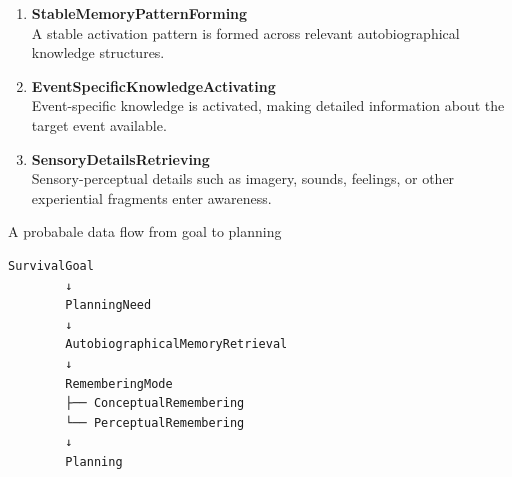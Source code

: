 \documentclass[a4paper]{article}
\begin{document}
\begin{enumerate}
        \item \textbf{StableMemoryPatternForming}\\
        A stable activation pattern is formed across relevant autobiographical knowledge structures.
        
        \item \textbf{EventSpecificKnowledgeActivating}\\
        Event-specific knowledge is activated, making detailed information about the target event available.
        
        \item \textbf{SensoryDetailsRetrieving}\\
        Sensory-perceptual details such as imagery, sounds, feelings, or other experiential fragments enter awareness.
    \end{enumerate}
    
    
    A probabale data flow from goal to planning
    
    \begin{verbatim}
SurvivalGoal
        ↓
        PlanningNeed
        ↓
        AutobiographicalMemoryRetrieval
        ↓
        RememberingMode
        ├── ConceptualRemembering
        └── PerceptualRemembering
        ↓
        Planning
    \end{verbatim}
    
    
    
    
\end{document}
